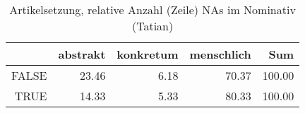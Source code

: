 \begin{table}[ht]
\centering
\begin{tabular}{rrrrr}
  \hline
 & abstrakt & konkretum & menschlich & Sum \\ 
  \hline
FALSE & 23.46 & 6.18 & 70.37 & 100.00 \\ 
  TRUE & 14.33 & 5.33 & 80.33 & 100.00 \\ 
   \hline
\end{tabular}
\caption{Artikelsetzung, relative Anzahl (Zeile) NAs im Nominativ (Tatian)} 
\end{table}
